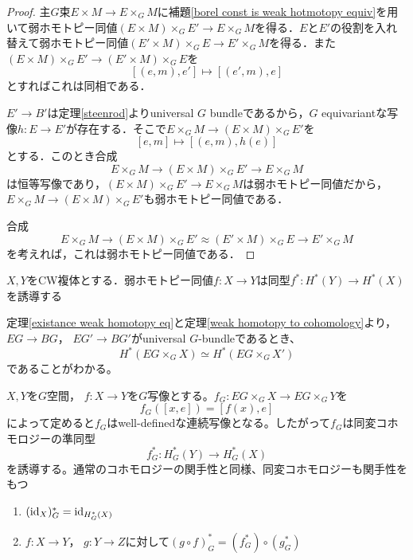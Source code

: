\begin{proof}
  主$G$束$E\times M\rightarrow E\times_GM$に補題\ref{borel const is weak hotmotopy equiv}を用いて弱ホモトピー同値$(E\times M)\times_GE'\rightarrow E\times_GM$を得る．$E$と$E'$の役割を入れ替えて弱ホモトピー同値$(E'\times M)\times_GE\rightarrow E'\times_GM$を得る．また$(E\times M)\times_GE'\rightarrow (E'\times M)\times_GE$を
  \[
  [(e,m),e']\mapsto [(e',m),e]
  \]
  とすればこれは同相である．

  $E'\rightarrow B'$は定理\ref{steenrod}よりuniversal $G$ bundleであるから，$G$ equivariantな写像$h\colon E\rightarrow E'$が存在する．そこで$E\times_GM\rightarrow (E\times M)\times_GE'$を
  \[
  [e,m]\mapsto [(e,m),h(e)]
  \]
  とする．このとき合成
  \[
  E\times_GM\rightarrow (E\times M)\times_GE'\rightarrow E\times_GM
  \]
  は恒等写像であり，$(E\times M)\times_GE'\rightarrow E\times_GM$は弱ホモトピー同値だから，$E\times_GM\rightarrow (E\times M)\times_GE'$も弱ホモトピー同値である．
  
  合成
  \[
  E\times_GM\rightarrow (E\times M)\times_GE'\approx (E'\times M)\times_GE\rightarrow E'\times_GM
  \]
  を考えれば，これは弱ホモトピー同値である．
\end{proof}

\begin{theo}\cite{hatcher Top}\label{weak homotopy to cohomology}
  $X,Y$をCW複体とする．弱ホモトピー同値$f\colon X\rightarrow Y$は同型$f^*\colon H^*(Y)\rightarrow H^*(X)$を誘導する
\end{theo}

定理\ref{existance weak homotopy eq}と定理\ref{weak homotopy to cohomology}より， $EG\rightarrow BG$， $EG'\rightarrow BG'$がuniversal $G$-bundleであるとき、
\[
H^*(EG\times_GX)\simeq H^*(EG\times_GX')
\]
であることがわかる。

$X, Y$を$G$空間， $f\colon X\rightarrow Y$を$G$写像とする。$f_G\colon EG\times_GX\rightarrow EG\times_GY$を
\[
f_G([x, e])=[f(x), e]
\]
によって定めると$f_G$はwell-definedな連続写像となる。したがって$f_G$は同変コホモロジーの準同型
\[
f_G^*\colon H^*_G(Y)\rightarrow H^*_G(X)
\]
を誘導する。通常のコホモロジーの関手性と同様、同変コホモロジーも関手性をもつ
\begin{prop}\:
  \begin{enumerate}
    \item $(\text{id}_{X})_G^*=\text{id}_{H^*_G(X)}$
    \item $f\colon X\rightarrow Y$， $g\colon Y\rightarrow Z$に対して$(g\circ f)_G^*=(f_G^*)\circ(g_G^*)$
  \end{enumerate}
\end{prop}

